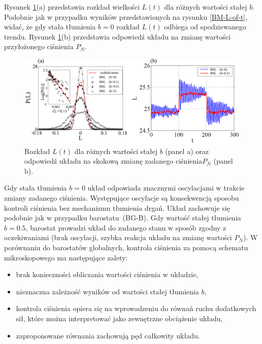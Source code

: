 \documentclass[12pt,a4paper,openright]{report} %
\begin{document}
Rysunek \ref{BM-rozklad-skok}(a) przedstawia rozkład wielkości $L(t)$ dla różnych wartości stałej $b$. Podobnie jak w przypadku wyników przedstawionych na rysunku \ref{BM-L-of-t}, widać, że gdy stała tłumienia $b=0$ rozkład $L(t)$ odbiega od spodziewanego trendu. Rysunek \ref{BM-rozklad-skok}(b) przedstawia odpowiedź układu na zmianę wartości przyłożonego ciśnienia $P_N$.
\begin{figure}[h]
\centering
\includegraphics[width=160mm]{rysunki/BM-rozklad-skok.pdf}
\caption{Rozkład $L(t)$ dla różnych wartości stałej $b$ (panel a) oraz odpowiedź układu na skokową zmianę zadanego ciśnienia$P_N$ (panel b).}
\label{BM-rozklad-skok}
\end{figure}
%
Gdy stała tłumienia $b=0$ układ odpowiada znacznymi oscylacjami w trakcie zmiany zadanego ciśnienia. Występujące oscylacje są konsekwencją sposobu kontroli ciśnienia bez mechanizmu tłumienia drgań. Układ zachowuje się podobnie jak w przypadku barostatu~(BG-B). Gdy wartość stałej tłumienia $b=0.5$, barostat prowadzi układ do zadanego stanu w sposób zgodny z oczekiwaniami (brak oscylacji, szybka reakcja układu na zmianę wartości $P_N$). W porównaniu do barostatów globalnych, kontrola ciśnienia za pomocą schematu mikroskopowego ma następujące zalety:
\begin{itemize}
\item{brak konieczności obliczania wartości ciśnienia w układzie, }
\item{nieznaczna zależność wyników od wartości stałej tłumienia $b$,}
\item{kontrola ciśnienia opiera się na wprowadzeniu do równań ruchu dodatkowych sił, które można interpretować jako zewnętrzne obciążenie układu,}
\item{zaproponowane równania zachowują pęd całkowity układu.}
\end{itemize}
%
%
%
\end{document}
